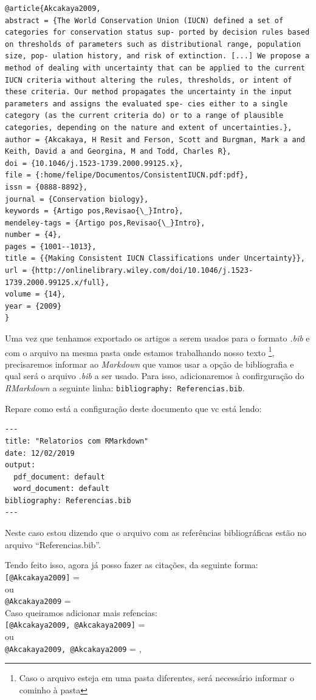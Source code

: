 \documentclass[]{book}
\begin{document}
\begin{verbatim}
@article{Akcakaya2009,
abstract = {The World Conservation Union (IUCN) defined a set of categories for conservation status sup- ported by decision rules based on thresholds of parameters such as distributional range, population size, pop- ulation history, and risk of extinction. [...] We propose a method of dealing with uncertainty that can be applied to the current IUCN criteria without altering the rules, thresholds, or intent of these criteria. Our method propagates the uncertainty in the input parameters and assigns the evaluated spe- cies either to a single category (as the current criteria do) or to a range of plausible categories, depending on the nature and extent of uncertainties.},
author = {Akcakaya, H Resit and Ferson, Scott and Burgman, Mark a and Keith, David a and Georgina, M and Todd, Charles R},
doi = {10.1046/j.1523-1739.2000.99125.x},
file = {:home/felipe/Documentos/ConsistentIUCN.pdf:pdf},
issn = {0888-8892},
journal = {Conservation biology},
keywords = {Artigo pos,Revisao{\_}Intro},
mendeley-tags = {Artigo pos,Revisao{\_}Intro},
number = {4},
pages = {1001--1013},
title = {{Making Consistent IUCN Classifications under Uncertainty}},
url = {http://onlinelibrary.wiley.com/doi/10.1046/j.1523-1739.2000.99125.x/full},
volume = {14},
year = {2009}
}
\end{verbatim}

Uma vez que tenhamos exportado os artigos a serem usados para o formato \emph{.bib} e com o arquivo na mesma pasta onde estamos trabalhando nosso texto \footnote{Caso o arquivo esteja em uma pasta diferentes, será necessário informar o cominho à pasta}, precisaremos informar ao \emph{Markdown} que vamos usar a opção de bibliografia e qual será o arquivo \emph{.bib} a ser usado. Para isso, adicionaremos à confirguração do \emph{RMarkdown} a seguinte linha: \texttt{bibliography:\ Referencias.bib}.

Repare como está a configuração deste documento que vc está lendo:

\begin{verbatim}
---
title: "Relatorios com RMarkdown"
date: 12/02/2019
output:
  pdf_document: default
  word_document: default
bibliography: Referencias.bib
---
\end{verbatim}

Neste caso estou dizendo que o arquivo com as referências bibliográficas estão no arquivo ``Referencias.bib''.

Tendo feito isso, agora já posso fazer as citações, da seguinte forma:\\
\texttt{{[}@Akcakaya2009{]}} = \citep{Akcakaya2009}\\
ou\\
\texttt{@Akcakaya2009} = \citet{Akcakaya2009}\\
Caso queiramos adicionar mais refencias:\\
\texttt{{[}@Akcakaya2009,\ @Akcakaya2009{]}} = \citep[\citet{Akcakaya2009}]{Akcakaya2009}\\
ou\\
\texttt{@Akcakaya2009,\ @Akcakaya2009} = \citet{Akcakaya2009}, \citet{Akcakaya2009}
\end{document}
